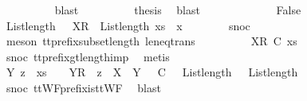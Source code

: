 \ \ \ \ \ \ \ \ \isamarkupfalse%
\ blast\isanewline
\ \ \ \ \ \ \isamarkupfalse%
\ \isamarkupfalse%
\ {\isacharquery}thesis\ \isamarkupfalse%
\ blast\isanewline
\ \ \ \ \isamarkupfalse%
\isanewline
\ \ \isamarkupfalse%
\isanewline
\ \ \ \ \isamarkupfalse%
\ False\isanewline
\ \ \ \ \isamarkupfalse%
\ \isamarkupfalse%
\ {\isachardoublequoteopen}List{\isachardot}length\ {\isacharparenleft}{\isasymrho}\ {\isacharat}\ {\isacharbrackleft}{\isacharbrackleft}X{\isacharbrackright}\isactrlsub R{\isacharbrackright}{\isacharparenright}\ {\isacharless}\ List{\isachardot}length\ {\isacharparenleft}xs\ {\isacharat}\ {\isacharbrackleft}x{\isacharbrackright}{\isacharparenright}{\isachardoublequoteclose}\isanewline
\ \ \ \ \ \ \isamarkupfalse%
\ snoc\ \isanewline
\ \ \ \ \ \ \isamarkupfalse%
\ {\isacharparenleft}meson\ tt{\isacharunderscore}prefix{\isacharunderscore}subset{\isacharunderscore}length\ le{\isacharunderscore}neq{\isacharunderscore}trans{\isacharparenright}\isanewline
\ \ \ \ \isamarkupfalse%
\ \isamarkupfalse%
\ {\isachardoublequoteopen}{\isasymrho}\ {\isacharat}\ {\isacharbrackleft}{\isacharbrackleft}X{\isacharbrackright}\isactrlsub R{\isacharbrackright}\ {\isasymlesssim}\isactrlsub C\ xs{\isachardoublequoteclose}\isanewline
\ \ \ \ \ \ \isamarkupfalse%
\ snoc\ tt{\isacharunderscore}prefix{\isacharunderscore}gt{\isacharunderscore}length{\isacharunderscore}imp\ \isamarkupfalse%
\ metis\isanewline
\ \ \ \ \isamarkupfalse%
\ \isamarkupfalse%
\ {\isachardoublequoteopen}{\isasymexists}Y\ z\ {\isasymrho}\ xs\ {\isacharequal}\ {\isasymrho}\ {\isacharat}\ {\isacharbrackleft}{\isacharbrackleft}Y{\isacharbrackright}\isactrlsub R{\isacharbrackright}\ {\isacharat}\ z\ {\isasymand}\ X\ {\isasymsubseteq}\ Y\ {\isasymand}\ {\isasymrho}\ {\isasymlesssim}\isactrlsub C\ {\isasymrho}\ {\isasymand}\ List{\isachardot}length\ {\isasymrho}\ {\isacharequal}\ List{\isachardot}length\ {\isasymrho}{\isachardoublequoteclose}\isanewline
\ \ \ \ \ \ \isamarkupfalse%
\ snoc\ ttWF{\isacharunderscore}prefix{\isacharunderscore}is{\isacharunderscore}ttWF\ \isamarkupfalse%
\ blast\isanewline
\ \ \ \ \isamarkupfalse%
\ \isamarkupfalse%
